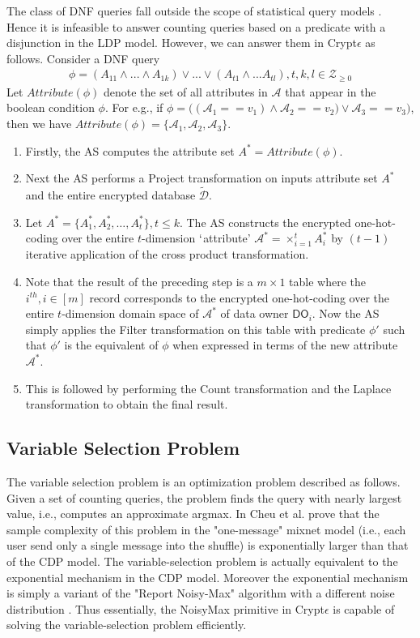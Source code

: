 The class of DNF queries fall outside the scope of statistical query models \cite{DNF}. Hence it is infeasible to answer counting queries based on a predicate with a disjunction in the \textsf{LDP} model. However, we can answer them in Crypt$\epsilon$ as follows.
Consider a DNF query 
\begin{gather}\phi = (A_{11}\land ...\land A_{1k}) \vee ... \vee (A_{t1}\land ... A_{tl}), t, k,l \in \mathcal{Z}_{\geq 0} \end{gather}
Let $Attribute(\phi)$ denote the set of all attributes in $\mathcal{A}$ that appear in the boolean condition $\phi$. For e.g., if $\phi = \big((\mathcal{A}_1==v_1) \land \mathcal{A}_2==v_2) \vee \mathcal{A}_3==v_3 \big)$, then  we have $Attribute(\phi)=\{\mathcal{A}_1, \mathcal{A}_2,\mathcal{A}_3\}$. \begin{enumerate}\item Firstly, the \textsf{AS} computes the attribute set $A^*=Attribute(\phi)$.
\item Next the \textsf{AS} performs a \textsf{Project} transformation on inputs attribute set $A^*$ and the entire encrypted database $\boldsymbol{\tilde{\mathcal{D}}}$. 
\item Let $A^*= \{A^*_1,A^*_2,\ldots,A^*_t\}, t \leq k$. The \textsf{AS} constructs the encrypted one-hot-coding over the entire $t$-dimension $\lq$attribute' $\mathcal{A}^*=\times_{i=1}^t A^*_i$ by $(t-1)$ iterative application of the cross product transformation. 
\item Note that the result of the preceding step is a $m\times 1$ table where the $i^{th} , i \in [m]$ record corresponds to the encrypted one-hot-coding over the entire $t$-dimension domain space of $\mathcal{A}^*$ of data owner $\textsf{DO}_i$. Now the \textsf{AS} simply applies the \textsf{Filter} transformation on this table with predicate $\phi'$  such that $\phi'$ is the equivalent of $\phi$ when expressed in terms of the new  attribute $\mathcal{A}^*$.
\item This is followed by performing the \textsf{Count} transformation and the \textsf{Laplace} transformation to obtain the final result. 
\end{enumerate}
\subsection*{Variable Selection Problem} The variable selection problem is an optimization problem described as follows. Given a set of counting queries, the problem finds the query with nearly largest value, i.e., computes an approximate argmax. In \cite{mixnets} Cheu et al. prove that the sample complexity of this problem in the "one-message" mixnet model (i.e., each user send only a single message into the shuffle) is exponentially larger than that of the \textsf{CDP} model. The variable-selection problem is actually equivalent to the exponential mechanism\cite{Dork} in the \textsf{CDP} model. Moreover the exponential mechanism is simply a variant of the "Report Noisy-Max" algorithm with a different noise distribution \cite{Nm}. Thus essentially, the \textsf{NoisyMax} primitive in Crypt$\epsilon$ is capable of solving the variable-selection problem efficiently. 
